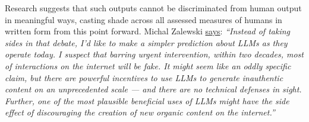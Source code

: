Research suggests that such outputs cannot be discriminated from human output in meaningful ways, casting shade across all assessed measures of humans in written form \cite{sadasivan2023can} from this point forward. Michal Zalewski \href{https://lcamtuf.substack.com/p/llms-a-bleak-future-ahead}{says}: \textit{``Instead of taking sides in that debate, I’d like to make a simpler prediction about LLMs as they operate today. I suspect that barring urgent intervention, within two decades, most of interactions on the internet will be fake. It might seem like an oddly specific claim, but there are powerful incentives to use LLMs to generate inauthentic content on an unprecedented scale — and there are no technical defenses in sight. Further, one of the most plausible beneficial uses of LLMs might have the side effect of discouraging the creation of new organic content on the internet.''}

